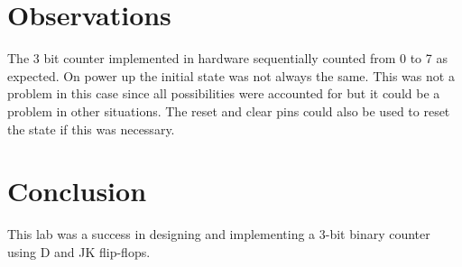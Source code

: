 \documentclass[12pt]{article}
\begin{document}

\section{Observations}

The 3 bit counter implemented in hardware sequentially counted
from 0 to 7 as expected.
On power up the initial state was not always the same.
This was not a problem in this case since all possibilities were
accounted for but it could be a problem in other situations.
The reset and clear pins could also be used to reset the state
if this was necessary.


\section{Conclusion}

This lab was a success in designing and implementing a 3-bit binary
counter using D and JK flip-flops.


%
%
\end{document}
